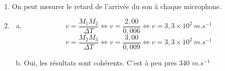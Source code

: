 \documentclass[12pt, a4paper]{article}
\begin{document}
    \begin{Exercise}[number={25}]
        \begin{enumerate}[1.]
            \item On peut mesurer le retard de l'arrivée du son à chaque microphone.
            \item   \begin{enumerate}[a.]
                        \item   \begin{equation*}
                                    v=\frac{M_1M_2}{\Delta T}
                                    \iff v=\frac{2{,}00}{0{,}006}
                                    \iff v=3{,}3\times 10^2\ \si{m.s^{-1}}
                                \end{equation*}
                                \begin{equation*}
                                    v=\frac{M_2M_3}{\Delta T}
                                    \iff v=\frac{3{,}00}{0{,}009}
                                    \iff v=3{,}3\times 10^2\ \si{m.s^{-1}}
                                \end{equation*}
                        \item Oui, les résultats sont cohérents. C'est à peu pres 340 $\si{m.s^{-1}}$
                    \end{enumerate}
        \end{enumerate}
    \end{Exercise}
\end{document}

